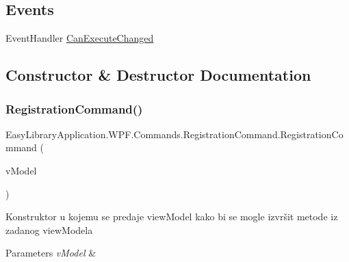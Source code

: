 \subsection*{Events}
\begin{DoxyCompactItemize}
\item 
Event\+Handler \mbox{\hyperlink{class_easy_library_application_1_1_w_p_f_1_1_commands_1_1_registration_command_aa9f534c660272afc0486680f4e1abdbc}{Can\+Execute\+Changed}}
\end{DoxyCompactItemize}


\subsection{Constructor \& Destructor Documentation}
\mbox{\label{class_easy_library_application_1_1_w_p_f_1_1_commands_1_1_registration_command_a830045f8e9e7d2b018e8ce9c9361e2fc}} 
\subsubsection{\texorpdfstring{Registration\+Command()}{RegistrationCommand()}}
{\footnotesize\ttfamily Easy\+Library\+Application.\+W\+P\+F.\+Commands.\+Registration\+Command.\+Registration\+Command (\begin{DoxyParamCaption}\item[{\mbox{\hyperlink{class_easy_library_application_1_1_w_p_f_1_1_view_model_1_1_registration_view_model}{Registration\+View\+Model}}}]{v\+Model }\end{DoxyParamCaption})}



Konstruktor u kojemu se predaje view\+Model kako bi se mogle izvršit metode iz zadanog view\+Modela 


\begin{DoxyParams}{Parameters}
{\em v\+Model} & \\
\hline
\end{DoxyParams}


